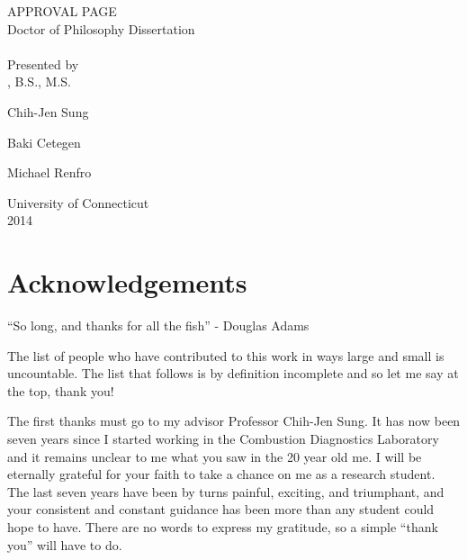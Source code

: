 \documentclass[12pt,letterpaper,oneside,final]{book}
\begin{document}
\pagestyle{main}
\setcounter{page}{1}
\begin{center}
APPROVAL PAGE \\
Doctor of Philosophy Dissertation \\
\thetitle \\
\blankline \blankline
Presented by \\
\theauthor, B.S., M.S. \\
\end{center}
\blankline
{}
\vspace{-0.5\baselineskip}
\begin{center}
Chih-Jen Sung
\end{center}
\blankline
{}
\vspace{-0.5\baselineskip}
\begin{center}
Baki Cetegen
\end{center}
\blankline
{}
\vspace{-0.5\baselineskip}
\begin{center}
Michael Renfro
\end{center}
\blankline \blankline \blankline \blankline \blankline
\begin{center}
University of Connecticut \\
2014
\end{center}
\newpage

{}
\chapter*{Acknowledgements}
``So long, and thanks for all the fish'' - Douglas Adams

The list of people who have contributed to this work in ways large and small
is uncountable. The list that follows is by definition incomplete
and so let me say at the top, thank you!

The first thanks must go to my advisor Professor Chih-Jen Sung. It has now been seven years since I started working in
the Combustion Diagnostics Laboratory and it remains unclear to me what you saw in the 20 year old me.
I will be eternally grateful for your faith to take a chance on me as a research student.
The last seven years have been by turns painful, exciting, and triumphant,
and your consistent and constant guidance has been more than any student could hope to
have. There are no words to express my gratitude, so a simple ``thank you''
will have to do.
\end{document}
